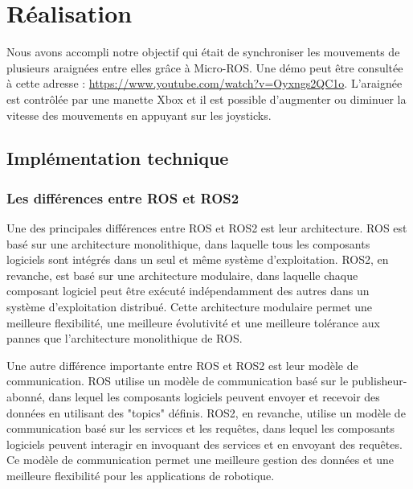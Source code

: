 	\chapter{Réalisation}

Nous avons accompli notre objectif qui était de synchroniser les mouvements de plusieurs araignées 
entre elles grâce à Micro-ROS.
Une démo peut être consultée à cette adresse : \url{https://www.youtube.com/watch?v=Oyxngs2QC1o}.
\linebreak
L'araignée est contrôlée par une manette Xbox et il est possible d'augmenter ou diminuer la vitesse des mouvements en appuyant sur 
les joysticks.

		\section{Implémentation technique}

			\subsection{Les différences entre ROS et ROS2}

Une des principales différences entre ROS et ROS2 est leur architecture. ROS est basé sur une architecture monolithique, 
dans laquelle tous les composants logiciels sont intégrés dans un seul et même système d'exploitation. 
ROS2, en revanche, est basé sur une architecture modulaire, dans laquelle chaque composant logiciel peut être exécuté 
indépendamment des autres dans un système d'exploitation distribué. Cette architecture modulaire permet une meilleure flexibilité, 
une meilleure évolutivité et une meilleure tolérance aux pannes que l'architecture monolithique de ROS. 
\linebreak

Une autre différence importante entre ROS et ROS2 est leur modèle de communication. ROS utilise un modèle de communication basé 
sur le publisheur-abonné, dans lequel les composants logiciels peuvent envoyer et recevoir des données en utilisant des "topics" définis. 
ROS2, en revanche, utilise un modèle de communication basé sur les services et les requêtes, dans lequel les composants logiciels peuvent 
interagir en invoquant des services et en envoyant des requêtes. Ce modèle de communication permet une meilleure gestion des données et 
une meilleure flexibilité pour les applications de robotique. 
\linebreak

